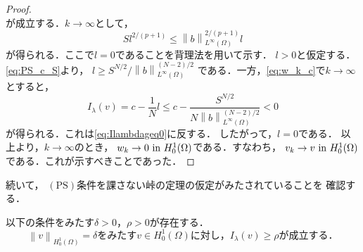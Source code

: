 \begin{proof}
\[ \]
 が成立する．$k \to \infty$として，
 \begin{equation}
  S l^{2/(p+1)} \leq \left\| b \right\|_{L^\infty(\Omega)}^{2/(p+1)} l 
   \label{eq:PS_c_S}
 \end{equation}
 が得られる．ここで$l = 0$であることを背理法を用いて示す．
 $l > 0$と仮定する．\eqref{eq:PS_c_S}より，
 $l \geq S^{N/2}/ \left\| b \right\|_{L^\infty(\Omega)}^{(N-2)/2}$
 である．一方，\eqref{eq:w_k_c}で$k \to \infty$とすると，
 \[
  I_\lambda(v) = c - \frac{1}{N}l \leq c - \frac{S^{N/2}}{N \left\| b
 \right\|_{L^\infty(\Omega)}^{(N-2)/2}} < 0
 \]
 が得られる．これは\eqref{eq:Ilambdageq0}に反する．
 したがって，$l = 0$である．
 以上より，$k \to \infty$のとき，
 $w_k \to 0 ~\text{in}~ H_0^1(\Omega)$である．すなわち，
 $v_k \to v ~\text{in}~ H_0^1(\Omega)$である．これが示すべきことであった．\qedhere
\end{proof}

続いて，
$(\mathrm{PS})$条件を課さない峠の定理の仮定がみたされていることを
確認する．

\begin{lem} \label{lem:delta_rho}
 以下の条件をみたす$\delta > 0$，$\rho > 0$が存在する．
 \begin{equation}
  \text{$\left\|v \right\|_{H^1_0(\Omega)} = \delta$をみたす$v \in
   H_0^1(\Omega)$に対し，$I_\lambda(v) \geq \rho$が成立する．} 
   \label{eq:delta_rho}
 \end{equation}
\end{lem}

